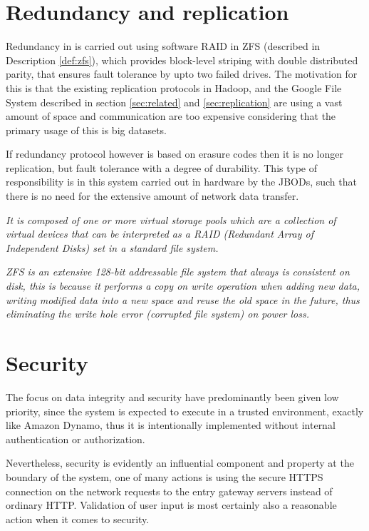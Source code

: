 \section{Redundancy and replication}
Redundancy in \CodeName is carried out using \eg software RAID in ZFS (described in Description \ref{def:zfs}), which provides block-level striping with double distributed parity, that ensures fault tolerance by upto two failed drives. The motivation for this is that the existing replication protocols in \eg Hadoop, and the Google File System described in section \ref{sec:related} and \ref{sec:replication} are using a vast amount of space and communication are too expensive considering that the primary usage of this is big datasets.
\newline

If redundancy protocol however is based on erasure codes then it is no longer replication, but fault tolerance with a degree of durability. This type of responsibility is in this system carried out in hardware by the JBODs, such that there is no need for the extensive amount of network data transfer.
\vspace*{2mm}

\begin{definition}[ZFS] \label{def:zfs}
\textit{It is composed of one or more virtual storage pools which are a collection of virtual devices that can be interpreted as a RAID (Redundant Array of Independent Disks) set in a standard file system.}
\newline

\textit{ZFS is an extensive 128-bit addressable file system that always is consistent on disk, this is because it performs a copy on write operation when adding new data, \ie writing modified data into a new space and reuse the old space in the future, thus eliminating the write hole error (corrupted file system) \eg on power loss.}
\end{definition}
\vspace*{2mm}

\section{Security} \label{sec:security}
The focus on data integrity and security have predominantly been given low priority, since the system is expected to execute in a trusted environment, exactly like Amazon Dynamo, thus it is intentionally implemented without internal authentication or authorization.
\newline

Nevertheless, security is evidently an influential component and property at the boundary of the system, one of many actions is \eg using the secure HTTPS connection on the network requests to the entry gateway servers instead of ordinary HTTP. Validation of user input is most certainly also a reasonable action when it comes to security.
